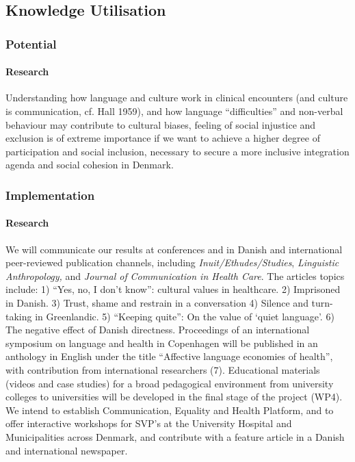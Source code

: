 \documentclass[twocolumn, issue, rga, authordate]{jote-new-article}
\begin{document}
\subsection{Knowledge Utilisation}



\subsubsection{Potential}


\paragraph{Research}


Understanding how language and culture work in clinical encounters (and culture is communication, cf. Hall 1959), and how language
``difficulties'' and non-verbal behaviour may contribute to cultural biases, feeling of social injustice and exclusion is of extreme importance if we want to achieve a higher degree of participation and social inclusion, necessary to secure a more inclusive integration agenda and social cohesion in Denmark.


\subsubsection{Implementation}



\paragraph{Research}


We will communicate our results at conferences and in Danish and international peer-reviewed publication channels, including
\emph{Inuit/Ethudes/Studies}, \emph{Linguistic Anthropology,} and
\emph{Journal of} \emph{Communication in Health Care}. The articles topics include: 1) ``Yes, no, I don't know'': cultural values in healthcare. 2) Imprisoned in Danish. 3) Trust, shame and restrain in a conversation 4) Silence and turn-taking in Greenlandic. 5) ``Keeping quite'': On the value of `quiet language'. 6) The negative effect of Danish directness. Proceedings of an international symposium on language and health in Copenhagen will be published in an anthology in English under the title ``Affective language economies of health'', with contribution from international researchers (7). Educational materials
(videos and case studies) for a broad pedagogical environment from university colleges to universities will be developed in the final stage of the project (WP4). We intend to establish Communication, Equality and Health Platform, and to offer interactive workshops for SVP's at the University Hospital and Municipalities across Denmark, and contribute with a feature article in a Danish and international newspaper.
\end{document}
